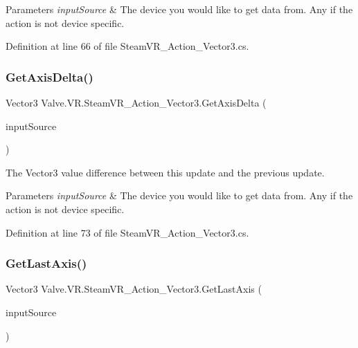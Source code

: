 \begin{DoxyParams}{Parameters}
{\em input\+Source} & The device you would like to get data from. Any if the action is not device specific.\\
\hline
\end{DoxyParams}


Definition at line 66 of file Steam\+V\+R\+\_\+\+Action\+\_\+\+Vector3.\+cs.

\mbox{\label{class_valve_1_1_v_r_1_1_steam_v_r___action___vector3_ac8df802433c105f70c635dd4919cf433}} 
\subsubsection{\texorpdfstring{GetAxisDelta()}{GetAxisDelta()}}
{\footnotesize\ttfamily Vector3 Valve.\+V\+R.\+Steam\+V\+R\+\_\+\+Action\+\_\+\+Vector3.\+Get\+Axis\+Delta (\begin{DoxyParamCaption}\item[{\mbox{\hyperlink{namespace_valve_1_1_v_r_a82e5bf501cc3aa155444ee3f0662853f}{Steam\+V\+R\+\_\+\+Input\+\_\+\+Sources}}}]{input\+Source }\end{DoxyParamCaption})}



The Vector3 value difference between this update and the previous update. 


\begin{DoxyParams}{Parameters}
{\em input\+Source} & The device you would like to get data from. Any if the action is not device specific.\\
\hline
\end{DoxyParams}


Definition at line 73 of file Steam\+V\+R\+\_\+\+Action\+\_\+\+Vector3.\+cs.

\mbox{\label{class_valve_1_1_v_r_1_1_steam_v_r___action___vector3_aa1b08a373d780aa48b52284b65e59434}} 
\subsubsection{\texorpdfstring{GetLastAxis()}{GetLastAxis()}}
{\footnotesize\ttfamily Vector3 Valve.\+V\+R.\+Steam\+V\+R\+\_\+\+Action\+\_\+\+Vector3.\+Get\+Last\+Axis (\begin{DoxyParamCaption}\item[{\mbox{\hyperlink{namespace_valve_1_1_v_r_a82e5bf501cc3aa155444ee3f0662853f}{Steam\+V\+R\+\_\+\+Input\+\_\+\+Sources}}}]{input\+Source }\end{DoxyParamCaption})}



